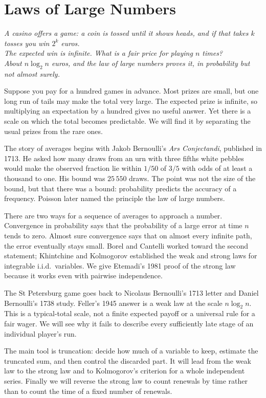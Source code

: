 \chapter{Laws of Large Numbers}
\begin{center}\itshape
A casino offers a game: a coin is tossed until it shows heads, and if that takes $k$ tosses you win $2^k$ euros.\\
The expected win is infinite. What is a fair price for playing $n$ times?\\
About $n\log_2n$ euros, and the law of large numbers proves it, in probability but not almost surely.
\end{center}

Suppose you pay for a hundred games in advance. Most prizes are small, but one long run of tails may make the total very large. The expected prize is infinite, so multiplying an expectation by a hundred gives no useful answer. Yet there is a scale on which the total becomes predictable. We will find it by separating the usual prizes from the rare ones.

The story of averages begins with Jakob Bernoulli's \emph{Ars Conjectandi}, published in 1713. He asked how many draws from an urn with three fifths white pebbles would make the observed fraction lie within $1/50$ of $3/5$ with odds of at least a thousand to one. His bound was $25\,550$ draws. The point was not the size of the bound, but that there was a bound: probability predicts the accuracy of a frequency. Poisson later named the principle the law of large numbers.

There are two ways for a sequence of averages to approach a number. Convergence in probability says that the probability of a large error at time $n$ tends to zero. Almost sure convergence says that on almost every infinite path, the error eventually stays small. Borel and Cantelli worked toward the second statement; Khintchine and Kolmogorov established the weak and strong laws for integrable i.i.d.\ variables. We give Etemadi's 1981 proof of the strong law because it works even with pairwise independence.

The St Petersburg game goes back to Nicolaus Bernoulli's 1713 letter and Daniel Bernoulli's 1738 study. Feller's 1945 answer is a weak law at the scale $n\log_2 n$. This is a typical-total scale, not a finite expected payoff or a universal rule for a fair wager. We will see why it fails to describe every sufficiently late stage of an individual player's run.

The main tool is truncation: decide how much of a variable to keep, estimate the truncated sum, and then control the discarded part. It will lead from the weak law to the strong law and to Kolmogorov's criterion for a whole independent series. Finally we will reverse the strong law to count renewals by time rather than to count the time of a fixed number of renewals.

